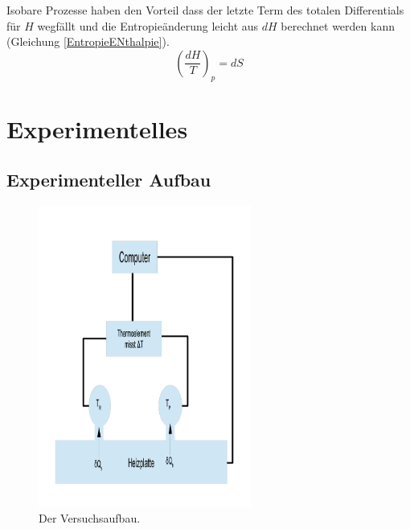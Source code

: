 \documentclass[a4paper,12pt,oneside,onecolum,final,openany]{report}
\begin{document}
Isobare Prozesse haben den Vorteil dass der letzte Term des totalen Differentials für $H$ wegfällt und die Entropieänderung leicht aus $dH$ berechnet werden kann (Gleichung \ref{EntropieENthalpie}).\\


\begin{equation} \label{EntropieEnthalpie}
\left(\frac{dH}{T}\right)_p = dS
\end{equation}


\chapter{Experimentelles}
\section{Experimenteller Aufbau}
\begin{figure}[h]
\centering
\includegraphics[width=7cm]{VB.png}
\caption{Der Versuchsaufbau.}
\end{figure} 
\FloatBarrier
\end{document}

